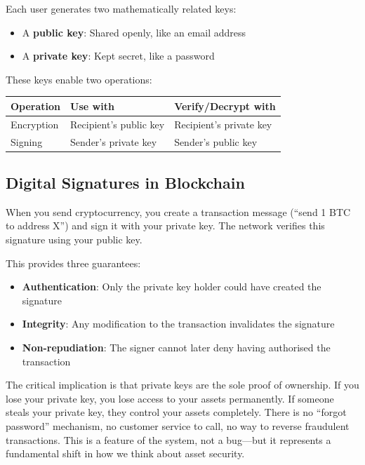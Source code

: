 \documentclass[11pt,a4paper]{article}
\begin{document}
Each user generates two mathematically related keys:
\begin{itemize}
    \item A \textbf{public key}: Shared openly, like an email address
    \item A \textbf{private key}: Kept secret, like a password
\end{itemize}

These keys enable two operations:

\begin{center}
\begin{tabular}{lll}
\toprule
\textbf{Operation} & \textbf{Use with} & \textbf{Verify/Decrypt with} \\
\midrule
Encryption & Recipient's public key & Recipient's private key \\
Signing & Sender's private key & Sender's public key \\
\bottomrule
\end{tabular}
\end{center}

\subsection{Digital Signatures in Blockchain}

When you send cryptocurrency, you create a transaction message (``send 1 BTC to address X'') and sign it with your private key. The network verifies this signature using your public key.

This provides three guarantees:
\begin{itemize}
    \item \textbf{Authentication}: Only the private key holder could have created the signature
    \item \textbf{Integrity}: Any modification to the transaction invalidates the signature
    \item \textbf{Non-repudiation}: The signer cannot later deny having authorised the transaction
\end{itemize}

The critical implication is that private keys are the sole proof of ownership. If you lose your private key, you lose access to your assets permanently. If someone steals your private key, they control your assets completely. There is no ``forgot password'' mechanism, no customer service to call, no way to reverse fraudulent transactions. This is a feature of the system, not a bug---but it represents a fundamental shift in how we think about asset security.
\end{document}

